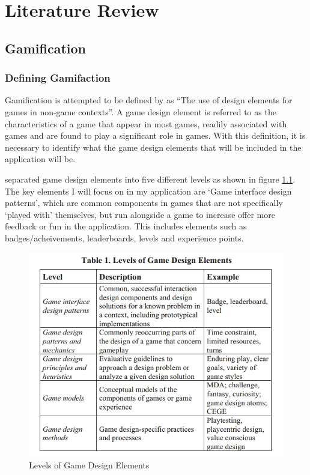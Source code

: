 \chapter{Literature Review}
\label{chap:litReview}

\section{Gamification}


\subsection{Defining Gamifaction}
Gamification is attempted to be defined by \cite{Deterding:2011:GDE:2181037.2181040} as ``The use of design elements for games in non-game contexts''. 
A game design element is referred to as the characteristics of a game that appear in most games, readily associated with games and are found to play a significant role in games.
With this definition, it is necessary to identify what the game design elements that will be included in the application will be. 

\cite{Deterding:2011:GDE:2181037.2181040} separated game design elements into five different levels as shown in figure \ref{fig:GameDesignElements}. 
The key elements I will focus on in my application are `Game interface design patterns', which are common components in games that are not specifically `played with' themselves, but run alongside a game to increase offer more feedback or fun in the application.
This includes elements such as badges/acheivements, leaderboards, levels and experience points.

\begin{figure}[ht]
	\centering
	\includegraphics[scale=0.45]{images/DeterdingsLevelsOfGameDesignElements.jpg}
	\caption{Levels of Game Design Elements}
	\label{fig:GameDesignElements}
\end{figure}


